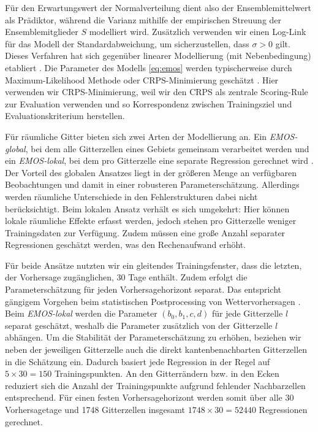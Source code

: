 Für den Erwartungswert der Normalverteilung dient also der Ensemblemittelwert als Prädiktor, während die Varianz mithilfe der empirischen Streuung der Ensemblemitglieder $S$ modelliert wird. Zusätzlich verwenden wir einen Log-Link für das Modell der Standardabweichung, um sicherzustellen, dass $\sigma>0$ gilt. Dieses Verfahren hat sich gegenüber linearer Modellierung (mit Nebenbedingung) etabliert \parencite{gebetsberger2018estimation}. Die Parameter des Modells \eqref{eq:emos} werden typischerweise durch Maximum-Likelihood Methode oder CRPS-Minimierung geschätzt \parencite{gneiting2005emos}. Hier verwenden wir CRPS-Minimierung, weil wir den CRPS als zentrale Scoring-Rule zur Evaluation verwenden und so Korrespondenz zwischen Trainingsziel und Evaluationskriterium herstellen.

Für räumliche Gitter bieten sich zwei Arten der Modellierung an. Ein \emph{EMOS-global}, bei dem alle Gitterzellen eines Gebiets gemeinsam verarbeitet werden und ein \emph{EMOS-lokal}, bei dem pro Gitterzelle eine separate Regression gerechnet wird \parencite{climaguidelines}. Der Vorteil des globalen Ansatzes liegt in der größeren Menge an verfügbaren Beobachtungen und damit in einer robusteren Parameterschätzung. Allerdings werden räumliche Unterschiede in den Fehlerstrukturen dabei nicht berücksichtigt. Beim lokalen Ansatz verhält es sich umgekehrt: Hier können lokale räumliche Effekte erfasst werden, jedoch stehen pro Gitterzelle weniger Trainingsdaten zur Verfügung. Zudem müssen eine große Anzahl separater Regressionen geschätzt werden, was den Rechenaufwand erhöht.

Für beide Ansätze nutzten wir ein gleitendes Trainingsfenster, dass die letzten, der Vorhersage zugänglichen, 30 Tage enthält. Zudem erfolgt die Parameterschätzung für jeden Vorhersagehorizont separat. Das entspricht gängigem Vorgehen beim statistischen Postprocessing von Wettervorhersagen \parencite{gneiting2014calibration}. Beim \emph{EMOS-lokal} werden die Parameter $(b_0,b_1,c,d)$ für jede Gitterzelle $l$ separat geschätzt, weshalb die Parameter zusätzlich von der Gitterzelle $l$ abhängen. Um die Stabilität der Parameterschätzung zu erhöhen, beziehen wir neben der jeweiligen Gitterzelle auch die direkt kantenbenachbarten Gitterzellen in die Schätzung ein. Dadurch basiert jede Regression in der Regel auf $5 \times 30 = 150$ Trainingspunkten. An den Gitterrändern bzw. in den Ecken reduziert sich die Anzahl der Trainingspunkte aufgrund fehlender Nachbarzellen entsprechend. Für einen festen Vorhersagehorizont werden somit über alle 30 Vorhersagetage und 1748 Gitterzellen insgesamt $1748 \times 30 = 52440$ Regressionen gerechnet.

